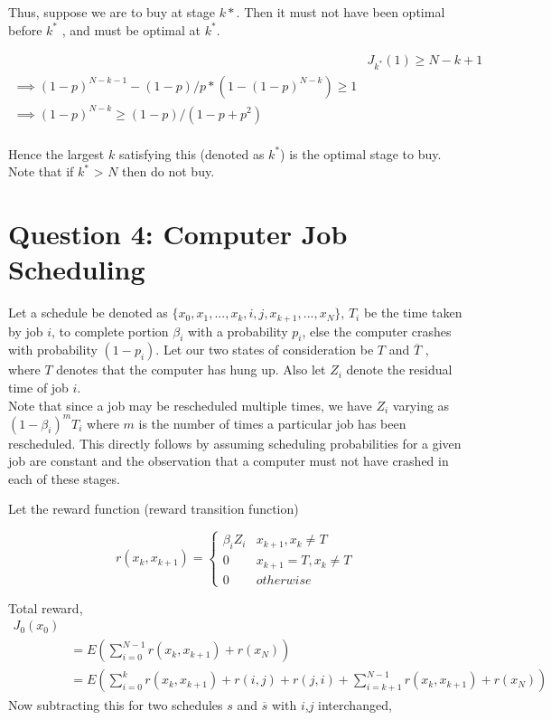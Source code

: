 \documentclass[12pt]{article}
\begin{document}
Thus, suppose we are to buy at stage $k*$. Then it must not have been optimal before $k^*$ , and must be optimal at $k^*$.

\begin{align*}
& J_{k^*}(1) \geqslant N-k+1 \\
\implies  (1-p)^{N-k-1} -(1-p)/p*(1-(1-p)^{N-k}) \geqslant 1 \\
\implies  (1-p)^{N-k}  \geqslant (1-p)/(1-p+p^2) \\
\end{align*}

Hence the largest $k$ satisfying this (denoted as $k^*$) is the optimal stage to buy. Note that if $k^*$ > $N$ then do not buy.

\section{Question 4: Computer Job Scheduling}

Let a schedule be denoted as $\{ x_0,x_1,...,x_k,i,j,x_{k+1},...,x_N\}$, $T_i$ be the time taken by job $i$, to complete portion $\beta_i$ with a probability $p_i$, else the computer crashes with probability $(1-p_i)$. Let our two states of consideration be $T$ and $\overline{T} $ , where $T$ denotes that the computer has hung up. Also let $Z_i$ denote the residual time of job $i$. \\

Note that since a job may be rescheduled multiple times, we have $Z_i$ varying as $(1-\beta_i)^mT_i$ where $m$ is the number of times a particular job has been rescheduled. This directly follows by assuming scheduling probabilities for a given job are constant and the observation that a computer must not have crashed in each of these stages.

Let the reward function (reward transition function)

\[ r(x_k,x_{k+1}) = \begin{cases} 
          \beta_iZ_i & x_{k+1},x_k \neq  T \\
           0 & x_{k+1}=T , x_k \neq T\\
          0 & otherwise
       \end{cases}
    \]
    
    Total reward,
\begin{align*}
J_0(x_0) \\
& = E( \sum_{i=0}^{N-1} r(x_k,x_{k+1}) + r(x_N)) \\
& = E( \sum_{i=0}^{k} r(x_k,x_{k+1})+  r(i,j)+r(j,i)+ \sum_{i=k+1}^{N-1} r(x_k,x_{k+1}) + r(x_N))
\end{align*}
Now subtracting this for two schedules $s$ and $\overline{s}$ with $i$,$j$ interchanged,
\end{document}
